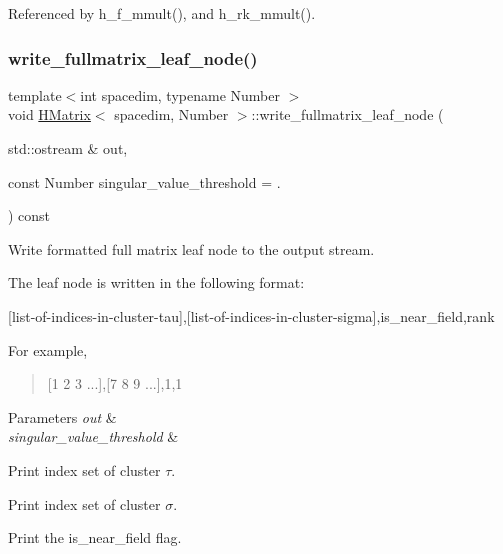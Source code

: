Referenced by h\+\_\+f\+\_\+mmult(), and h\+\_\+rk\+\_\+mmult().

\mbox{\label{classHMatrix_a42f958a13c56d64564d59487e67bc8a2}} 
\subsubsection{\texorpdfstring{write\+\_\+fullmatrix\+\_\+leaf\+\_\+node()}{write\_fullmatrix\_leaf\_node()}}
{\footnotesize\ttfamily template$<$int spacedim, typename Number $>$ \\
void \hyperlink{classHMatrix}{H\+Matrix}$<$ spacedim, Number $>$\+::write\+\_\+fullmatrix\+\_\+leaf\+\_\+node (\begin{DoxyParamCaption}\item[{std\+::ostream \&}]{out,  }\item[{const Number}]{singular\+\_\+value\+\_\+threshold = {.} }\end{DoxyParamCaption}) const}

Write formatted full matrix leaf node to the output stream.

The leaf node is written in the following format\+:

\begin{quote}


\end{quote}
\mbox{[}list-\/of-\/indices-\/in-\/cluster-\/tau\mbox{]},\mbox{[}list-\/of-\/indices-\/in-\/cluster-\/sigma\mbox{]},is\+\_\+near\+\_\+field,rank

For example,

\begin{quote}
\mbox{[}1 2 3 ...\mbox{]},\mbox{[}7 8 9 ...\mbox{]},1,1 \end{quote}



\begin{DoxyParams}{Parameters}
{\em out} & \\
\hline
{\em singular\+\_\+value\+\_\+threshold} & \\
\hline
\end{DoxyParams}
Print index set of cluster $\tau$.

Print index set of cluster $\sigma$.

Print the {\ttfamily is\+\_\+near\+\_\+field} flag.

